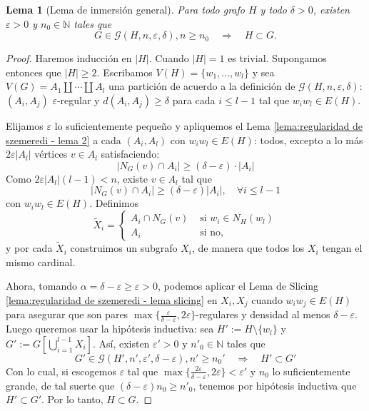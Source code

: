\documentclass[12pt]{report}
\theoremstyle{plain}
\newtheorem{lemma}[theorem]{Lema}
\theoremstyle{definition}
\newcommand{\naturals}{\mathbb{N}}
\newcommand{\abs}[1]{\left \vert #1 \right \vert}
\begin{document}
\begin{lemma}[Lema de inmersión general]\label{lema:regularidad de szemeredi - lema inmersion general}
Para todo grafo $H$ y todo $\delta > 0$, existen $\varepsilon > 0$ y $n_0 \in \naturals$ tales que
\[
    G \in \mathcal G (H, n , \varepsilon, \delta), n \geq n_0 \quad \Rightarrow \quad H \subset G.
\]
\end{lemma}
\begin{proof}
Haremos inducción en $\abs H$. Cuando $\abs H = 1$ es trivial. Supongamos entonces que $\abs H \geq 2$. Escribamos $V(H) = \{w_1, \ldots, w_l\}$ y sea $V(G) = A_1 \coprod \cdots \coprod A_l$ una partición de acuerdo a la definición de $\mathcal G (H, n , \varepsilon , \delta)$: $(A_i, A_j)$ $\varepsilon$-regular y $d(A_i, A_j) \geq \delta$ para cada $i \leq l-1$ tal que $w_i w_l \in E(H)$.

Elijamos $\varepsilon $ lo suficientemente pequeño y apliquemos el Lema \ref{lema:regularidad de szemeredi - lema 2} a cada $(A_i, A_l)$ con $w_i w_l \in E(H)$: todos, excepto a lo más $2 \varepsilon \abs {A_l}$ vértices $v \in A_l$ satisfaciendo:
\[
    \abs{N_G (v) \cap A_i} \geq (\delta - \varepsilon) \cdot \abs{A_i}
\]
Como $2 \varepsilon \abs{A_l} (l-1) < n$, existe $v \in A_l$ tal que
\[
    \abs{N_G (v) \cap A_i} \geq (\delta - \varepsilon) \abs{A_i}, \quad \forall i \leq l-1
\]
con $w_i w_l \in E(H)$. Definimos
\[
    \tilde X_i = \begin{cases}
    A_i \cap N_G (v) & \text{ si $w_i \in N_H (w_l)$} \\
    A_i & \text{ si no},
    \end{cases}
\]
y por cada $\tilde X_i$ construimos un subgrafo $X_i$, de manera que todos los $X_i$ tengan el mismo cardinal.

Ahora, tomando $\alpha = \delta - \varepsilon \geq \varepsilon >0 $, podemos aplicar el Lema de Slicing \ref{lema:regularidad de szemeredi - lema slicing} en $X_i, X_j$ cuando $w_i w_j \in E(H)$ para asegurar que son pares $\max\{\frac{\varepsilon}{\delta - \varepsilon}, 2 \varepsilon\}$-regulares y densidad al menos $\delta - \varepsilon$. Luego queremos usar la hipótesis inductiva: sea $H' := H \setminus \{w_l\}$ y $G':= G[\bigcup_{i = 1}^{l-1} X_i]$. Así, existen $\varepsilon ' > 0$ y $n'_0 \in \naturals$ tales que
\[
    G' \in \mathcal G (H', n', \varepsilon ', \delta - \varepsilon), n' \geq n_0 ' \quad \Rightarrow \quad H' \subset G'
\]
Con lo cual, si escogemos $\varepsilon$ tal que $\max \{\frac{2 \varepsilon}{\delta - \varepsilon}, 2 \varepsilon\} < \varepsilon '$ y $n_0$ lo suficientemente grande, de tal suerte que $(\delta - \varepsilon) n_0 \geq n'_0$, tenemos por hipótesis inductiva que $H' \subset G'$. Por lo tanto, $H \subset G$.
\end{proof}
\end{document}
